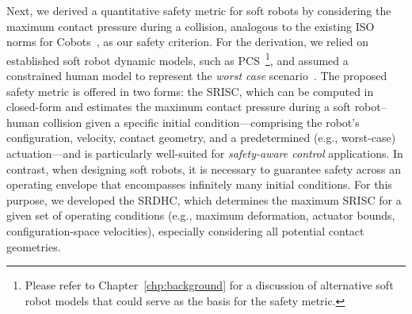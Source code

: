 Next, we derived a quantitative safety metric for soft robots by considering the maximum contact pressure during a collision, analogous to the existing ISO norms for \glspl{Cobot}~\citep{Isots_15066_2016}, as our safety criterion. For the derivation, we relied on established soft robot dynamic models, such as \gls{PCS}~\citep{renda2018discrete}\footnote{Please refer to Chapter~\ref{chp:background} for a discussion of alternative soft robot models that could serve as the basis for the safety metric.}, and assumed a constrained human model to represent the \emph{worst case} scenario~\citep{haddadin2009requirements}. The proposed safety metric is offered in two forms: the \gls{SRISC}, which can be computed in closed-form and estimates the maximum contact pressure during a soft robot–human collision given a specific initial condition—comprising the robot’s configuration, velocity, contact geometry, and a predetermined (e.g., worst-case) actuation—and is particularly well-suited for \emph{safety-aware control} applications. In contrast, when designing soft robots, it is necessary to guarantee safety across an operating envelope that encompasses infinitely many initial conditions. For this purpose, we developed the \gls{SRDHC}, which determines the maximum \gls{SRISC} for a given set of operating conditions (e.g., maximum deformation, actuator bounds, configuration-space velocities), especially considering all potential contact geometries.

